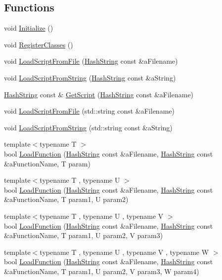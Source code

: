 \subsection*{Functions}
\begin{DoxyCompactItemize}
\item 
void \hyperlink{namespaceLUABind_aecf4fafdf19d34ea941b37f336821e72}{Initialize} ()
\item 
void \hyperlink{namespaceLUABind_a03661ad8570eb330634d5a5bd446f151}{Register\+Classes} ()
\item 
void \hyperlink{namespaceLUABind_ac3bb5a708c6471bf1fd888571141bb23}{Load\+Script\+From\+File} (\hyperlink{classHashString}{Hash\+String} const \&a\+Filename)
\item 
void \hyperlink{namespaceLUABind_affb461d6e5e2640f7cf334b5cf51715c}{Load\+Script\+From\+String} (\hyperlink{classHashString}{Hash\+String} const \&a\+String)
\item 
\hyperlink{classHashString}{Hash\+String} const \& \hyperlink{namespaceLUABind_abb3e6c7955087f9c94ef09e4226c8d1c}{Get\+Script} (\hyperlink{classHashString}{Hash\+String} const \&a\+Filename)
\item 
void \hyperlink{namespaceLUABind_a2ce8bef28d61033a2790902de6a38083}{Load\+Script\+From\+File} (std\+::string const \&a\+Filename)
\item 
void \hyperlink{namespaceLUABind_a26c005301a9c2b40b736e8769c190977}{Load\+Script\+From\+String} (std\+::string const \&a\+String)
\item 
{\footnotesize template$<$typename T $>$ }\\bool \hyperlink{namespaceLUABind_a4739bb89930d4a83413ea23dbb886e34}{Load\+Function} (\hyperlink{classHashString}{Hash\+String} const \&a\+Filename, \hyperlink{classHashString}{Hash\+String} const \&a\+Function\+Name, T param)
\item 
{\footnotesize template$<$typename T , typename U $>$ }\\bool \hyperlink{namespaceLUABind_a87bfd3ae071529a749bc37b45beeee1b}{Load\+Function} (\hyperlink{classHashString}{Hash\+String} const \&a\+Filename, \hyperlink{classHashString}{Hash\+String} const \&a\+Function\+Name, T param1, U param2)
\item 
{\footnotesize template$<$typename T , typename U , typename V $>$ }\\bool \hyperlink{namespaceLUABind_a44507ae07346bfde8db35f27b30536de}{Load\+Function} (\hyperlink{classHashString}{Hash\+String} const \&a\+Filename, \hyperlink{classHashString}{Hash\+String} const \&a\+Function\+Name, T param1, U param2, V param3)
\item 
{\footnotesize template$<$typename T , typename U , typename V , typename W $>$ }\\bool \hyperlink{namespaceLUABind_a5241633b520a8c5574856cfd5330f11f}{Load\+Function} (\hyperlink{classHashString}{Hash\+String} const \&a\+Filename, \hyperlink{classHashString}{Hash\+String} const \&a\+Function\+Name, T param1, U param2, V param3, W param4)
\end{DoxyCompactItemize}
